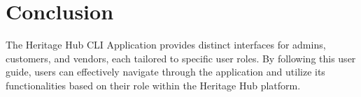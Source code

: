 \documentclass[12pt]{article}
\begin{document}
\section{Conclusion}
The Heritage Hub CLI Application provides distinct interfaces for admins, customers, and vendors, each tailored to specific user roles. By following this user guide, users can effectively navigate through the application and utilize its functionalities based on their role within the Heritage Hub platform.
\end{document}
